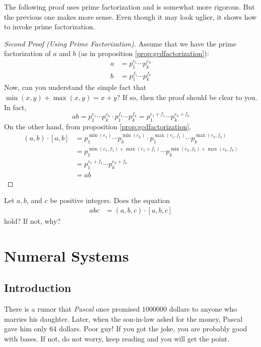 \documentclass{subfile}
\begin{document}
	The following proof uses prime factorization and is somewhat more rigorous. But the previous one makes more sense. Even though it may look uglier, it shows how to invoke prime factorization.
	\begin{proof}[Second Proof (Using Prime Factorization)]
		Assume that we have the prime factorization of $a$ and $b$ (as in proposition \eqref{prop:gcdfactorization}):
		\begin{align*}
			a
				& =p_1^{e_1}\cdots p_k^{e_k}\\
			b
				& =p_1^{f_1}\cdots p_k^{f_k}
		\end{align*}
		Now, can you understand the simple fact that $\min(x,y)+\max(x,y)=x+y$? If so, then the proof should be clear to you. In fact,
		\[ab=p_1^{e_1}\cdots p_k^{e_k}\cdot p_1^{f_1}\cdots p_k^{f_k}=p_1^{e_1+f_1}\cdots p_k^{e_k+f_k}\]
		On the other hand, from proposition \eqref{prop:gcdfactorization},
		\begin{align*}
			(a,b)\cdot[a,b]
			& = p_1^{\min(e_1)}\cdots p_k^{\min(e_k)}\cdot p_1^{\max(e_1,f_1)}\cdots p_k^{\max(e_k,f_k)}\\
			& = p_1^{\min(e_1,f_1)+\max(e_1+f_1)}\cdots p_k^{\min(e_k,f_k)+\max(e_k,f_k)}\\
			& = p_1^{e_1+f_1}\cdots p_k^{e_k+f_k}\\
			& = ab
		\end{align*}
	\end{proof}

	\begin{question}
		Let $a,b$, and $c$ be positive integers. Does the equation
			\begin{align*}
				abc
					& =(a,b,c)\cdot[a,b,c]
			\end{align*}
		hold? If not, why?
	\end{question}

	\section{Numeral Systems}
	\subsection{Introduction}
	There is a rumor that \textit{Pascal} once promised $1000000$ dollars to anyone who marries his daughter. Later, when the son-in-law asked for the money, Pascal gave him only $64$ dollars. Poor guy! If you got the joke, you are probably good with bases. If not, do not worry, keep reading and you will get the point.
\end{document}
